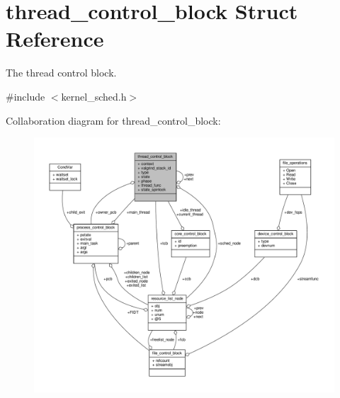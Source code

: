 \hypertarget{structthread__control__block}{\section{thread\-\_\-control\-\_\-block Struct Reference}
\label{structthread__control__block}
}


The thread control block.  




{\ttfamily \#include $<$kernel\-\_\-sched.\-h$>$}



Collaboration diagram for thread\-\_\-control\-\_\-block\-:
\nopagebreak
\begin{figure}[H]
\begin{center}
\leavevmode
\includegraphics[width=350pt]{structthread__control__block__coll__graph}
\end{center}
\end{figure}
